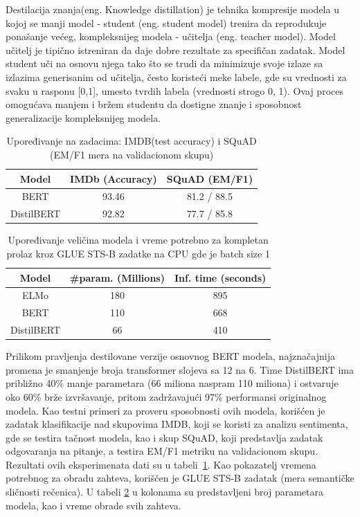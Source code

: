 \documentclass[12pt,oneside]{memoir}
\begin{document}
Destilacija znanja(eng. Knowledge distillation) \cite{ModelDistillation} je tehnika kompresije modela u kojoj se manji model - student (eng. student model) trenira da reprodukuje ponašanje većeg, kompleksnijeg modela - učitelja (eng. teacher model). Model učitelj je tipično istreniran da daje dobre rezultate za specifičan zadatak. Model student uči na osnovu njega tako što se trudi da minimizuje svoje izlaze sa izlazima generisanim od učitelja, često koristeći meke labele, gde su vrednosti za svaku u rasponu [0,1], umesto tvrdih labela (vrednosti strogo {0, 1}). Ovaj proces omogućava manjem i bržem studentu da dostigne znanje i sposobnost generalizacije kompleksnijeg modela. 

\begin{table}[h!]
	\centering
	\begin{tabular}{|c|c|c|}
		\hline
		Model & IMDb (Accuracy) & SQuAD (EM/F1) \\
		\hline
		BERT & 93.46 & 81.2 / 88.5 \\
		DistilBERT & 92.82 & 77.7 / 85.8 \\
		\hline
	\end{tabular}
	\caption{Upoređivanje na zadacima: IMDB(test accuracy) i SQuAD (EM/F1 mera na validacionom skupu)}
	\label{tab:bert_vs_distilbert_acc}
\end{table}

\begin{table}[h!]
	\centering
	\begin{tabular}{|c|c|c|}
		\hline
		Model & \#param. (Millions) & Inf. time (seconds) \\
		\hline
		ELMo & 180 & 895\\
		BERT & 110 & 668 \\
		DistilBERT & 66 & 410 \\
		\hline
	\end{tabular}
	\caption{Upoređivanje veličina modela i vreme potrebno za kompletan prolaz kroz GLUE STS-B zadatke na CPU gde je batch size 1}
	\label{tab:bert_vs_distilbert_params}
\end{table}

Prilikom pravljenja destilovane verzije osnovnog BERT modela, najznačajnija promena je smanjenje broja transformer slojeva sa 12 na 6. Time DistilBERT ima približno 40\% manje parametara (66 miliona naspram 110 miliona) i ostvaruje oko 60\% brže izvršavanje, pritom zadržavajući 97\% performansi originalnog modela. Kao testni primeri za proveru sposobnosti ovih modela, korišćen je zadatak klasifikacije nad skupovima IMDB, koji se koristi za analizu sentimenta, gde se testira tačnost modela, kao i skup SQuAD, koji predstavlja zadatak odgovaranja na pitanje, a testira EM/F1 metriku na validacionom skupu. Rezultati ovih eksperimenata dati su u tabeli~\ref{tab:bert_vs_distilbert_acc}. Kao pokazatelj vremena potrebnog za obradu zahteva, koriščen je GLUE STS-B zadatak (mera semantičke sličnosti rečenica). U tabeli \ref{tab:bert_vs_distilbert_params} u kolonama su predstavljeni broj parametara modela, kao i vreme obrade svih zahteva.
\end{document}
